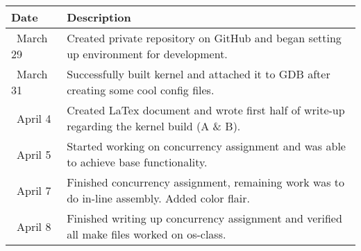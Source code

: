 \begin{tabular}{l l}\textbf{Date} & \textbf{Description}\\\hline
\ March 29 & Created private repository on GitHub and began setting up environment for development.\\\hline
\ March 31 & Successfully built kernel and attached it to GDB after creating some cool config files.\\\hline
\ April 4  & Created LaTex document and wrote first half of write-up regarding the kernel build (A \& B). \\\hline
\ April 5  & Started working on concurrency assignment and was able to achieve base functionality. \\\hline
\ April 7  & Finished concurrency assignment, remaining work was to do in-line assembly. Added color flair.\\\hline
\ April 8  & Finished writing up concurrency assignment and verified all make files worked on os-class. \\\hline
\end{tabular}
